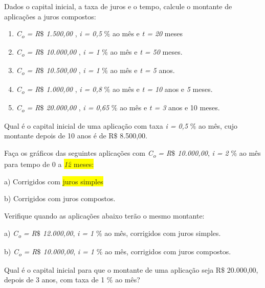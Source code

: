 \begin{exercicios}
\exitem{} Dados o capital inicial, a taxa de juros e o tempo, calcule o montante de aplicações a juros compostos:

\begin{enumerate}[label=\alph*)]
	\item \textit{C\textsubscript{o }} \textit{= R$\$$  1.500,00} ,  \textit{i = 0,5 }$\%$  ao mês e  \textit{t = 20} meses

	\item \textit{C\textsubscript{o }} \textit{= R$\$$  10.000,00} , \textit{i = 1 }$\%$ ao mês  e  \textit{t = 50 }meses.

	\item \textit{C\textsubscript{o }} \textit{= R$\$$  10.500,00} , \textit{i = 1 }$\%$ ao mês  e  \textit{t = 5 }anos.

	\item \textit{C\textsubscript{o }} \textit{= R$\$$  1.000,00} , \textit{i = 0,8 }$\%$ ao mês  e  \textit{t = 10 }anos e\textit{ 5 }meses.

	\item \textit{C\textsubscript{o }} \textit{= R$\$$  20.000,00} , \textit{i = 0,65 }$\%$ ao mês  e  \textit{t = 3 }anos e 10 meses.
\end{enumerate}

\exitem{} Qual é o capital inicial de uma aplicação com taxa \textit{i = 0,5 }$\%$  ao mês, cujo montante depois de 10 anos é de R$\$$  8.500,00.

\exitem{} Faça os gráficos das seguintes aplicações com \textit{C\textsubscript{o }} \textit{= R$\$$  10.000,00},  \textit{i = 2 }$\%$ ao mês  para tempo de 0 a \textit{\colorbox{yellow}{12}}\colorbox{yellow}{ meses:} 

a) Corrigidos com \colorbox{yellow}{juros simples}

b) Corrigidos com juros compostos.

\exitem{} Verifique quando as aplicações abaixo terão o mesmo montante:

a)  \textit{C\textsubscript{o }} \textit{= R$\$$  12.000,00},  \textit{i = 1 }$\%$  ao mês, corrigidos com juros simples.

b) \textit{C\textsubscript{o }} \textit{= R$\$$  10.000,00},  \textit{i = 1 }$\%$  ao mês, corrigidos com juros compostos.

\exitem{} Qual é o capital inicial para que o montante de uma aplicação seja R$\$$  20.000,00, depois de 3 anos, com taxa de 1 $\%$  ao mês?


\end{exercicios}
